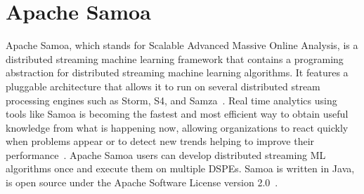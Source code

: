 \section{Apache Samoa}
Apache Samoa, which stands for Scalable Advanced Massive Online Analysis, is a
distributed streaming machine learning framework that contains a programing
abstraction for distributed streaming machine learning algorithms. It features
a pluggable architecture that allows it to run on several distributed stream
processing engines such as Storm, S4, and Samza~\cite{hid-sp18-405-www-samoa}.
Real time analytics using tools like Samoa is becoming the fastest and most
efficient way to obtain useful knowledge from what is happening now, allowing
organizations to react quickly when problems appear or to detect new trends
helping to improve their performance~\cite{hid-sp18-405-bif2015mining-samoa}.
Apache Samoa users can develop distributed streaming ML algorithms once and
execute them on multiple DSPEs. Samoa is written in Java, is open source under
the Apache Software License version 2.0~\cite{hid-sp18-405-mor2015samoa-samoa}.
